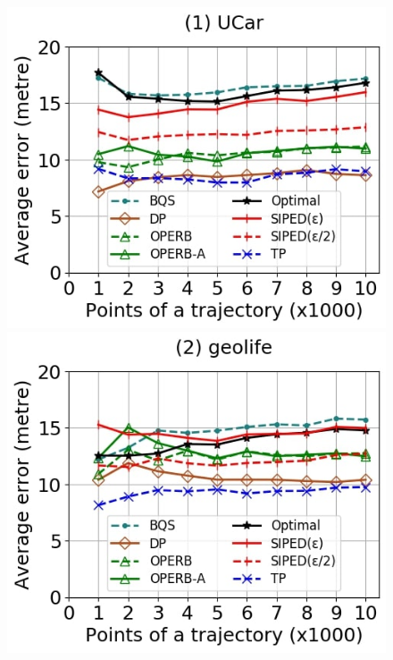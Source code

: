 {\begin{figure}[tb!]
	\centering
	\includegraphics[scale=0.250]{Figures/Exp-PED-error-size-service.jpg} 	\hspace{0.5ex}
	\includegraphics[scale=0.250]{Figures/Exp-PED-error-size-geolife.jpg}	\hspace{0.5ex}

\end{figure}}
